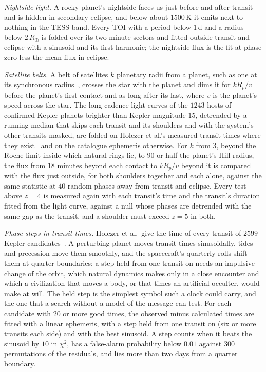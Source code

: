 \documentclass[3p,11pt]{elsarticle}
\begin{document}
\emph{Nightside light.} A rocky planet's nightside faces us just before and after
transit and is hidden in secondary eclipse, and below about $1500$\,K it emits next to
nothing in the TESS band. Every TOI with a period below $1$\,d and a radius below
$2\,R_\oplus$ is folded over its two-minute sectors and fitted outside transit and
eclipse with a sinusoid and its first harmonic; the nightside flux is the fit at phase
zero less the mean flux in eclipse.

\emph{Satellite belts.} A belt of satellites $k$ planetary radii from a planet, such as
one at its synchronous radius~\cite{SocasNavarro2018}, crosses the star with the planet
and dims it for $kR_p/v$ before the planet's first contact and as long after its last,
where $v$ is the planet's speed across the star. The long-cadence light curves of the
$1243$ hosts of confirmed Kepler planets brighter than Kepler magnitude $15$, detrended by
a running median that skips each transit and its shoulders and with the system's other
transits masked, are folded on Holczer et al.'s measured transit times where they
exist~\cite{Holczer2016} and on the catalogue ephemeris otherwise. For $k$ from $3$,
beyond the Roche limit inside which natural rings lie, to $90$ or half the planet's Hill
radius, the flux from $18$ minutes beyond each contact to $kR_p/v$ beyond it is compared
with the flux just outside, for both shoulders together and each alone, against the same
statistic at $40$ random phases away from transit and eclipse. Every test above $z=4$ is
measured again with each transit's time and the transit's duration fitted from the light
curve, against a null whose phases are detrended with the same gap as the transit, and a
shoulder must exceed $z=5$ in both.

\emph{Phase steps in transit times.} Holczer et al.\ give the time of every transit of
$2599$ Kepler candidates~\cite{Holczer2016}. A perturbing planet moves transit times
sinusoidally, tides and precession move them smoothly, and the spacecraft's quarterly
rolls shift them at quarter boundaries; a step held from one transit on needs an
impulsive change of the orbit, which natural dynamics makes only in a close encounter
and which a civilization that moves a body, or that times an artificial occulter, would
make at will. The held step is the simplest symbol such a clock could carry, and the one
that a search without a model of the message can test. For each candidate
with $20$ or more good times, the observed minus calculated times are fitted with a
linear ephemeris, with a step held from one transit on (six or more transits each side)
and with the best sinusoid. A step counts when it beats the sinusoid by $10$ in $\chi^2$,
has a false-alarm probability below $0.01$ against $300$ permutations of the residuals,
and lies more than two days from a quarter boundary.
\end{document}
